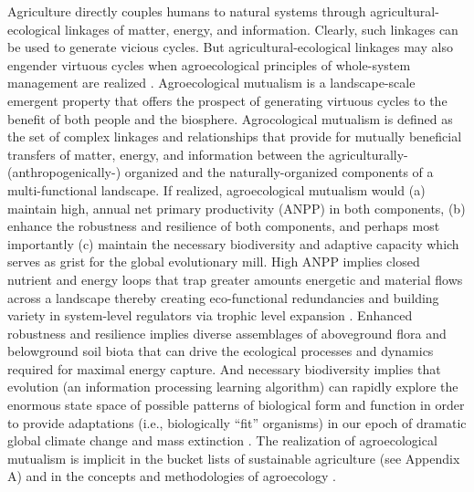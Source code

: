 Agriculture directly couples humans to natural systems through agricultural-ecological linkages of matter, energy, and information. Clearly, such linkages can be used to generate vicious cycles. But agricultural-ecological linkages may also engender virtuous cycles when agroecological principles of whole-system management are realized \citep{gliessman_agroecology:_2015}. Agroecological mutualism is a landscape-scale emergent property that offers the prospect of generating virtuous cycles to the benefit of both people and the biosphere. Agrocological mutualism is defined as the set of complex linkages and relationships that provide for mutually beneficial transfers of matter, energy, and information between the agriculturally- (anthropogenically-) organized and the naturally-organized components of a multi-functional landscape. If realized, agroecological mutualism would (a) maintain high, annual net primary productivity (ANPP) in both components, (b) enhance the robustness and resilience of both components, and perhaps most importantly (c) maintain the necessary biodiversity and adaptive capacity which serves as grist for the global evolutionary mill.  High ANPP implies closed nutrient and energy loops that trap greater amounts energetic and material flows across a landscape thereby creating eco-functional redundancies and building variety in system-level regulators via trophic level expansion \citep{ashby_introduction_1955}. Enhanced robustness and resilience implies diverse assemblages of aboveground flora and belowground soil biota that can drive the ecological processes and dynamics required for maximal energy capture. And necessary biodiversity implies that evolution (an information processing learning algorithm) can rapidly explore the enormous state space of possible patterns of biological form and function in order to provide adaptations (i.e., biologically \enquote{fit} organisms) in our epoch of dramatic global climate change and mass extinction \citep{ceballos_accelerated_2015}. The realization of agroecological mutualism is implicit in the bucket lists of sustainable agriculture (see Appendix A) and in the concepts and methodologies of agroecology \citep{gliessman_agroecology:_2015}. 

